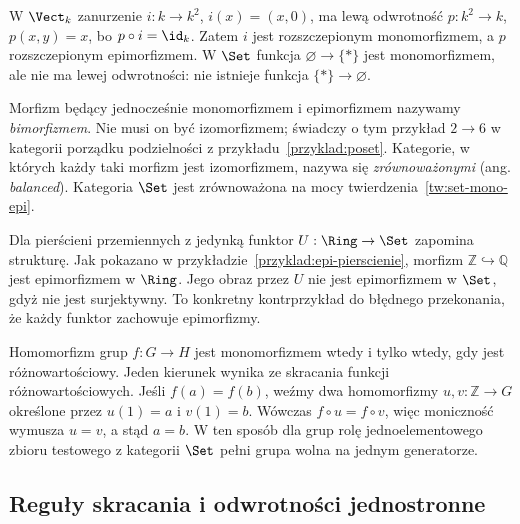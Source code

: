 \begin{przyklad}
W $\Vect_k$ zanurzenie $i:k\to k^2$, $i(x)=(x,0)$, ma lewą odwrotność $p:k^2\to k$, $p(x,y)=x$, bo $p\circ i=\id_k$. Zatem $i$ jest rozszczepionym monomorfizmem, a $p$ rozszczepionym epimorfizmem. W $\Set$ funkcja $\varnothing\to\{*\}$ jest monomorfizmem, ale nie ma lewej odwrotności: nie istnieje funkcja $\{*\}\to\varnothing$.
\end{przyklad}

\begin{uwaga}
Morfizm będący jednocześnie monomorfizmem i epimorfizmem nazywamy \emph{bimorfizmem}. Nie musi on być izomorfizmem; świadczy o tym przykład $2\to6$ w kategorii porządku podzielności z przykładu~\ref{przyklad:poset}. Kategorie, w których każdy taki morfizm jest izomorfizmem, nazywa się \emph{zrównoważonymi} (ang. \emph{balanced}). Kategoria $\Set$ jest zrównoważona na mocy twierdzenia~\ref{tw:set-mono-epi}.
\end{uwaga}


\begin{przyklad}
Dla pierścieni przemiennych z jedynką funktor $U:\Ring\to\Set$ zapomina strukturę. Jak pokazano w przykładzie~\ref{przyklad:epi-pierscienie}, morfizm $\mathbb Z\hookrightarrow\mathbb Q$ jest epimorfizmem w $\Ring$. Jego obraz przez $U$ nie jest epimorfizmem w $\Set$, gdyż nie jest surjektywny. To konkretny kontrprzykład do błędnego przekonania, że każdy funktor zachowuje epimorfizmy.
\end{przyklad}

\begin{przyklad}
Homomorfizm grup $f:G\to H$ jest monomorfizmem wtedy i tylko wtedy, gdy jest różnowartościowy. Jeden kierunek wynika ze skracania funkcji różnowartościowych. Jeśli $f(a)=f(b)$, weźmy dwa homomorfizmy $u,v:\mathbb Z\to G$ określone przez $u(1)=a$ i $v(1)=b$. Wówczas $f\circ u=f\circ v$, więc moniczność wymusza $u=v$, a stąd $a=b$. W ten sposób dla grup rolę jednoelementowego zbioru testowego z kategorii $\Set$ pełni grupa wolna na jednym generatorze.
\end{przyklad}

\subsection{Reguły skracania i odwrotności jednostronne}

